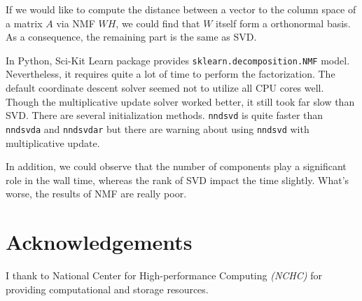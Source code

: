 \documentclass[12pt, a4paper]{article}
\begin{document}
If we would like to compute the distance between a vector to the column space of a matrix $A$ via NMF $WH$, we could find that $W$ itself form a orthonormal basis. As a consequence, the remaining part is the same as SVD.

In Python, Sci-Kit Learn package provides \texttt{sklearn.decomposition.NMF} model. Nevertheless, it requires quite a lot of time to perform the factorization. The default coordinate descent solver seemed not to utilize all CPU cores well. Though the multiplicative update solver worked better, it still took far slow than SVD. There are several initialization methods. \texttt{nndsvd} is quite faster than \texttt{nndsvda} and \texttt{nndsvdar} but there are warning about using \texttt{nndsvd} with multiplicative update.

In addition, we could observe that the number of components play a significant role in the wall time, whereas the rank of SVD impact the time slightly. What's worse, the results of NMF are really poor.

\section*{Acknowledgements}

I thank to \textsf{National Center for High-performance Computing} \textit{(NCHC)} for providing computational and storage resources.
\end{document}

